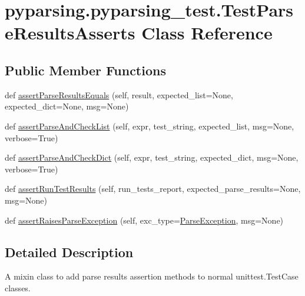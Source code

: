 \hypertarget{classpyparsing_1_1pyparsing__test_1_1TestParseResultsAsserts}{}\section{pyparsing.\+pyparsing\+\_\+test.\+Test\+Parse\+Results\+Asserts Class Reference}
\label{classpyparsing_1_1pyparsing__test_1_1TestParseResultsAsserts}
\subsection*{Public Member Functions}
\begin{DoxyCompactItemize}
\item 
def \hyperlink{classpyparsing_1_1pyparsing__test_1_1TestParseResultsAsserts_a1560d074926037c6140d8270a46ede90}{assert\+Parse\+Results\+Equals} (self, result, expected\+\_\+list=None, expected\+\_\+dict=None, msg=None)
\item 
def \hyperlink{classpyparsing_1_1pyparsing__test_1_1TestParseResultsAsserts_afc1d04b41cc6f3a0b2a68de8c4154ee3}{assert\+Parse\+And\+Check\+List} (self, expr, test\+\_\+string, expected\+\_\+list, msg=None, verbose=True)
\item 
def \hyperlink{classpyparsing_1_1pyparsing__test_1_1TestParseResultsAsserts_a4673557263087f48eab8423a0244b69c}{assert\+Parse\+And\+Check\+Dict} (self, expr, test\+\_\+string, expected\+\_\+dict, msg=None, verbose=True)
\item 
def \hyperlink{classpyparsing_1_1pyparsing__test_1_1TestParseResultsAsserts_a8fc4240c815fc793fcd37d1eafe0bc57}{assert\+Run\+Test\+Results} (self, run\+\_\+tests\+\_\+report, expected\+\_\+parse\+\_\+results=None, msg=None)
\item 
def \hyperlink{classpyparsing_1_1pyparsing__test_1_1TestParseResultsAsserts_ab2ab8ebc9ec3735145d5ca18b51d341d}{assert\+Raises\+Parse\+Exception} (self, exc\+\_\+type=\hyperlink{classpyparsing_1_1ParseException}{Parse\+Exception}, msg=None)
\end{DoxyCompactItemize}


\subsection{Detailed Description}
\begin{DoxyVerb}A mixin class to add parse results assertion methods to normal unittest.TestCase classes.
\end{DoxyVerb}
 


